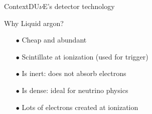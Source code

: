 \documentclass[10pt]{beamer}
\begin{document}
\begin{frame}{Context}{DU$\nu$E's detector technology}
\begin{scriptsize}
\begin{minipage}{0.48\textwidth}
    			Why Liquid argon?
    			\begin{itemize}
    				\item[$\bullet$] Cheap and abundant
    				\item[$\bullet$] Scintillate at ionization (used for trigger)
    				\item[$\bullet$] Is inert: does not absorb electrons
    				\item[$\bullet$] Is dense: ideal for neutrino physics
    				\item[$\bullet$] Lots of electrons created at ionization
    			\end{itemize}
    		\end{minipage}
    	\end{scriptsize}
    	
    \end{frame}
    
\end{document}

